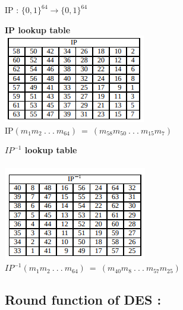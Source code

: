 \documentclass[11pt]{article}
\begin{document}
IP : $\{0,1\}^{64} \rightarrow \{0,1\}^{64}$
\begin{multicols}{2}
\textbf{IP lookup table}\\

\includegraphics{Images/L_5-6/IP.png}\\
IP\((m_1m_2\ .\ .\ .\ m_{64})\ =\ (m_58m_50\ .\ .\ .\ m_15 m_7)\)    

\columnbreak
\textbf{$IP^{-1}$ lookup table}\\\\
\includegraphics{Images/L_5-6/IP_INV.png}\\
\(IP^{-1}(m_1m_2\ .\ .\ .\ m_{64})\ =\ (m_40m_8\ .\ .\ .\ m_57 m_25)\)    
\end{multicols}

\subsection{Round function of DES :}
\end{document}
